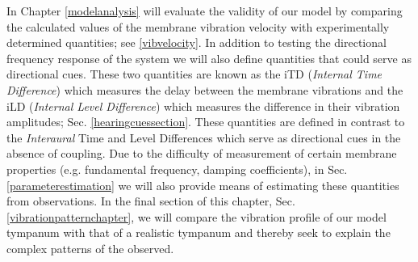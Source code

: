 In Chapter \ref{modelanalysis} will evaluate the validity of our model
by comparing the calculated values of the membrane vibration velocity with experimentally determined quantities; 
see \ref{vibvelocity}. In addition to testing the directional frequency
response of the system we will also define quantities that could serve as directional cues. These two quantities are known
as the iTD (\emph{Internal Time Difference}) which measures the delay between the membrane vibrations and the iLD (\emph{Internal Level
Difference}) which measures the difference in their vibration amplitudes; Sec. \ref{hearingcuessection}. These quantities are defined in contrast to the
\emph{Interaural} Time and Level  Differences which serve as directional cues in the absence of coupling. Due to the difficulty of measurement of certain membrane
properties (e.g. fundamental frequency, damping coefficients), in Sec. \ref{parameterestimation} we will also provide means of estimating these quantities from observations.
In the final section of this chapter, Sec. \ref{vibrationpatternchapter}, we will compare the vibration profile of our model tympanum with that of a realistic tympanum and thereby
seek to explain the complex patterns of the observed.
